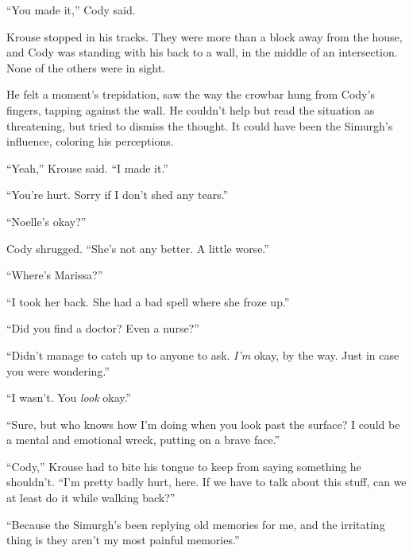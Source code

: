 





``You made it,'' Cody said.



Krouse stopped in his tracks.  They were more than a block away from the house, and Cody was standing with his back to a wall, in the middle of an intersection.  None of the others were in sight.



He felt a moment's trepidation, saw the way the crowbar hung from Cody's fingers, tapping against the wall.  He couldn't help but read the situation as threatening, but tried to dismiss the thought.  It could have been the Simurgh's influence, coloring his perceptions.



``Yeah,'' Krouse said.  ``I made it.''



``You're hurt.  Sorry if I don't shed any tears.''



``Noelle's okay?''



Cody shrugged.  ``She's not any better.  A little worse.''



``Where's Marissa?''



``I took her back.  She had a bad spell where she froze up.''



``Did you find a doctor?  Even a nurse?''



``Didn't manage to catch up to anyone to ask.  \emph{I'm} okay, by the way.  Just in case you were wondering.''



``I wasn't.  You \emph{look} okay.''



``Sure, but who knows how I'm doing when you look past the surface?  I could be a mental and emotional wreck, putting on a brave face.''



``Cody,'' Krouse had to bite his tongue to keep from saying something he shouldn't.  ``I'm pretty badly hurt, here.  If we have to talk about this stuff, can we at least do it while walking back?''



``Because the Simurgh's been replying old memories for me, and the irritating thing is they aren't my most painful memories.''



